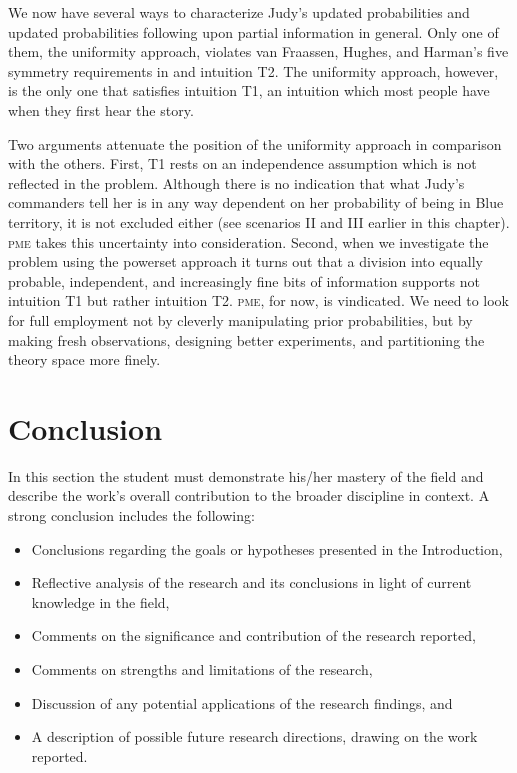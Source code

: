 \documentclass[phd,12pt,oneside]{ubcthesis}
\begin{document}
We now have several ways to characterize Judy's updated
probabilities and updated probabilities following upon partial
information in general. Only one of them, the uniformity approach,
violates van Fraassen, Hughes, and Harman's five symmetry requirements
in  and intuition T2. The uniformity
approach, however, is the only one that satisfies intuition T1, an
intuition which most people have when they first hear the story. 

Two arguments attenuate the position of the uniformity approach in
comparison with the others. First, T1 rests on an independence
assumption which is not reflected in the problem. Although there is no
indication that what Judy's commanders tell her is in any way
dependent on her probability of being in Blue territory, it is not
excluded either (see scenarios II and III earlier in this chapter).
\textsc{pme} takes this uncertainty into consideration. Second,
when we investigate the problem using the powerset approach it turns
out that a division into equally probable, independent, and
increasingly fine bits of information supports not intuition T1 but
rather intuition T2. \textsc{pme}, for now, is vindicated. We need
to look for full employment not by cleverly manipulating prior
probabilities, but by making fresh observations, designing better
experiments, and partitioning the theory space more finely.

\chapter{Conclusion}
\label{chp:zeetahgh}

In this section the student must demonstrate his/her mastery of the
field and describe the work's overall contribution to the broader
discipline in context. A strong conclusion includes the following:

\begin{itemize}
\item Conclusions regarding the goals or hypotheses presented in the
  Introduction,
\item Reflective analysis of the research and its conclusions in light
  of current knowledge in the field,
\item Comments on the significance and contribution of the research
  reported,
\item Comments on strengths and limitations of the research,
\item Discussion of any potential applications of the research
  findings, and
\item A description of possible future research directions, drawing on
  the work reported.
\end{itemize}
\end{document}
